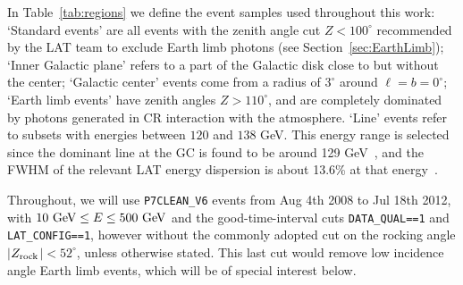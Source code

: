 \documentclass[aps,twocolumn,prd,superscriptaddress,showpacs,nofootinbib,fixfloat]{revtex4}
\newcommand{\GeV}{{\rm ~GeV}}
\newcommand{\zrock}{$Z_{\rm rock}$}
\begin{document}
In Table~\ref{tab:regions} we define the event samples
used throughout this work: `Standard events' are all
events with the zenith angle cut $Z<100^\circ$ recommended
by the LAT team to exclude Earth
limb photons (see Section~\ref{sec:EarthLimb}); `Inner
Galactic plane' refers to a part of the Galactic disk close
to but without the center; `Galactic center' events come from
a radius of $3^\circ$ around
$\ell=b=0^\circ$; `Earth limb events' have
zenith angles $Z>110^\circ$, and are completely
dominated by photons generated in CR interaction with the
atmosphere. `Line' events refer to subsets with energies
between $120$ and $138$ GeV. This energy range is selected
since the dominant line at the GC is found to be around 129
GeV~\cite{linepaper}, and the FWHM of the relevant LAT energy dispersion is about
13.6\% at that energy~\cite{Weniger:2012}.

Throughout, we will use \texttt{P7CLEAN\_V6} events from
Aug 4th 2008 to Jul 18th 2012, with $10\GeV\leq E\leq 500 \GeV$ and the good-time-interval cuts
\texttt{DATA\_QUAL==1} and \texttt{LAT\_CONFIG==1}, however
without the commonly adopted cut on the rocking angle
$|$\zrock$|<52^\circ$, unless otherwise stated. This last cut would remove
low incidence angle Earth limb events, which will be of special interest
below.
\medskip
\end{document}
